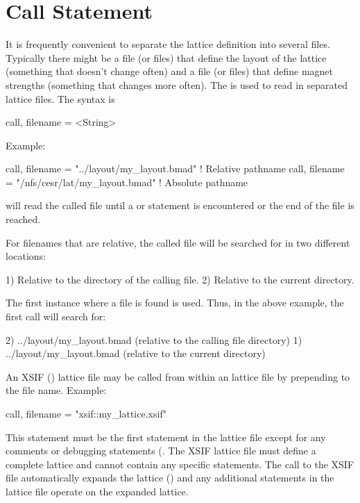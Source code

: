 {%
\section{Call Statement}
\label{s:call}

It is frequently convenient to separate the lattice definition into
several files.  Typically there might be a file (or files) that define
the layout of the lattice (something that doesn't change often) and a
file (or files) that define magnet strengths (something that changes
more often).  The  is used to read in separated lattice
files. The syntax is
\begin{example}
  call, filename = <String>
\end{example}
Example:
\begin{example}
  call, filename = "../layout/my_layout.bmad"      ! Relative pathname
  call, filename = "/nfs/cesr/lat/my_layout.bmad"  ! Absolute pathname
\end{example}
\bmad will read the called file until a  or 
statement is encountered or the end of the file is reached.

For filenames that are relative, the called file will be searched for in
two different locations:
\begin{example}
  1) Relative to the directory of the calling file.
  2) Relative to the current directory.
\end{example}
The first instance where a file is found is used.
Thus, in the above example, the first call will search for:
\begin{example}
  2) ../layout/my_layout.bmad  (relative to the calling file directory)
  1) ../layout/my_layout.bmad  (relative to the current directory)
\end{example}

An XSIF () lattice file may be called
from within an \bmad lattice file by prepending  to the
file name. Example:
\begin{example}
  call, filename = "xsif::my_lattice.xsif"
\end{example}
This statement must be the first statement in the \bmad lattice file
except for any comments or debugging statements (. 
The XSIF lattice file must define a
complete lattice and cannot contain any \bmad specific statements. The
call to the XSIF file automatically expands the lattice
() and any additional statements in the \bmad lattice
file operate on the expanded lattice.

}
